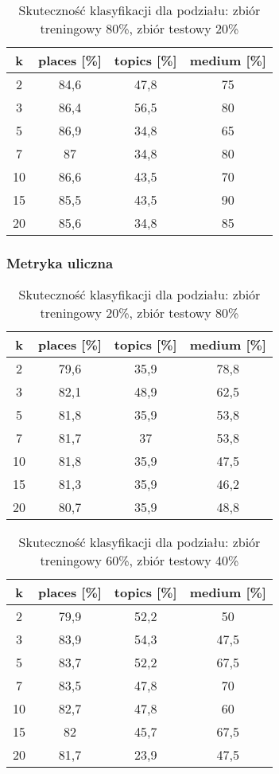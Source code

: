 \documentclass{classrep}
\begin{document}
\begin{table}[H]
	\centering
	\begin{tabular}{c c c c} 
		\hline
		\textbf{k} & \textbf{places [\%]} & \textbf{topics [\%]} &  \textbf{medium [\%]} \\ [0.5ex] 
		\hline
		\hline 
2 & 84,6 & 47,8 & 75 \\ 
3 & 86,4 & 56,5 & 80 \\ 
5 & 86,9 & 34,8 & 65 \\ 
7 & 87 & 34,8 & 80 \\ 
10 & 86,6 & 43,5 & 70 \\ 
15 & 85,5 & 43,5 & 90 \\ 
20 & 85,6 & 34,8 & 85 \\ 
		\hline
	\end{tabular}
	\caption{Skuteczność klasyfikacji dla podziału: zbiór treningowy 80\%, zbiór testowy 20\%}
\end{table}

\subsubsection{Metryka uliczna}
\begin{table}[H]
	\centering
	\begin{tabular}{c c c c} 
		\hline
		\textbf{k} & \textbf{places [\%]} & \textbf{topics [\%]} &  \textbf{medium [\%]} \\ [0.5ex] 
		\hline
		\hline 
2 & 79,6 & 35,9 & 78,8 \\ 
3 & 82,1 & 48,9 & 62,5 \\ 
5 & 81,8 & 35,9 & 53,8 \\ 
7 & 81,7 & 37 & 53,8 \\ 
10 & 81,8 & 35,9 & 47,5 \\ 
15 & 81,3 & 35,9 & 46,2 \\ 
20 & 80,7 & 35,9 & 48,8 \\ 
		\hline
	\end{tabular}
	\caption{Skuteczność klasyfikacji dla podziału: zbiór treningowy 20\%, zbiór testowy 80\%}
\end{table}

\begin{table}[H]
	\centering
	\begin{tabular}{c c c c} 
		\hline
		\textbf{k} & \textbf{places [\%]} & \textbf{topics [\%]} &  \textbf{medium [\%]} \\ [0.5ex] 
		\hline
		\hline 
2 & 79,9 & 52,2 & 50 \\ 
3 & 83,9 & 54,3 & 47,5 \\ 
5 & 83,7 & 52,2 & 67,5 \\ 
7 & 83,5 & 47,8 & 70 \\ 
10 & 82,7 & 47,8 & 60 \\ 
15 & 82 & 45,7 & 67,5 \\ 
20 & 81,7 & 23,9 & 47,5 \\ 
		\hline
	\end{tabular}
	\caption{Skuteczność klasyfikacji dla podziału: zbiór treningowy 60\%, zbiór testowy 40\%}
\end{table}
\end{document}
